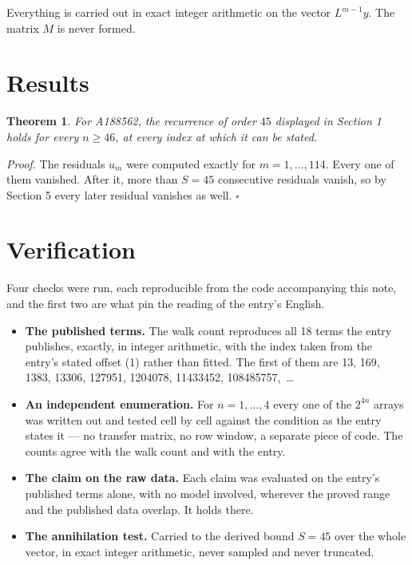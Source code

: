 \documentclass[11pt]{article}
\newtheorem{theorem}{Theorem}
\theoremstyle{definition}
\begin{document}
Everything is carried out in exact integer arithmetic on the vector $L^{m-1}y$. The matrix $M$ is never formed.

\section{Results}

\begin{theorem} For A188562, the recurrence of order $45$ displayed in Section 1 holds for every $n \ge 46$, at every index at which it can be stated.\end{theorem}

{\itshape Proof.} The residuals $u_m$ were computed exactly for $m = 1,\dots,114$. Every one of them vanished. After it, more than $S = 45$ consecutive residuals vanish, so by Section 5 every later residual vanishes as well. $\square$

\section{Verification}

Four checks were run, each reproducible from the code accompanying this note, and the first two are what pin the reading of the entry's English.

\begin{itemize}

\item {\bfseries The published terms.} The walk count reproduces all 18 terms the entry publishes, exactly, in integer arithmetic, with the index taken from the entry's stated offset (1) rather than fitted. The first of them are 13, 169, 1383, 13306, 127951, 1204078, 11433452, 108485757,~\dots

\item {\bfseries An independent enumeration.} For $n = 1,\dots,4$ every one of the $2^{4n}$ arrays was written out and tested cell by cell against the condition as the entry states it --- no transfer matrix, no row window, a separate piece of code. The counts agree with the walk count and with the entry.

\item {\bfseries The claim on the raw data.} Each claim was evaluated on the entry's published terms alone, with no model involved, wherever the proved range and the published data overlap. It holds there.

\item {\bfseries The annihilation test.} Carried to the derived bound $S = 45$ over the whole vector, in exact integer arithmetic, never sampled and never truncated.

\end{itemize}
\end{document}
